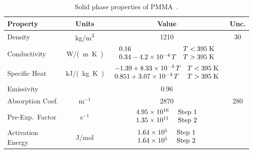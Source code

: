 \begin{table}[!h]
\caption[Solid phase PMMA properties]{Solid phase properties of PMMA~\cite{Fiola:FSJ2021}.}
\begin{center}
\begin{tabular}{|l|c|c|c|}
\hline
Property                    & Units         & Value                                                                                                                                        & Unc.           \\ \hline \hline
Density                     & \unit{kg/m^3}      & 1210                                                                                                                                         & 30             \\ \hline
Conductivity                & \unit{W/(m.K)} & $\begin{array}{ll} 0.16  & T<395 \; \hbox{K} \\  0.34 - 4.2 \times 10^{-4} \, T  & T>395 \; \hbox{K} \end{array}$                            &                \\ \hline
Specific Heat               & \unit{kJ/(kg.K)}       & $\begin{array}{ll} -1.39+ 8.33 \times 10^{-3} \, T & T<395 \; \hbox{K} \\ 0.851 + 3.07 \times 10^{-3} \, T & T>395 \; \hbox{K} \end{array}$  &                \\ \hline
Emissivity                  &               & 0.96                                                                                                                                         &                \\ \hline
Absorption Coef.            & m$^{-1}$      & 2870                                                                                                                                         & 280            \\ \hline
Pre-Exp.~Factor             & s$^{-1}$      & $\begin{array}{ll} 4.95 \times 10^{16} & \hbox{ Step 1} \\ 1.35 \times 10^{11} & \hbox{ Step 2} \end{array}$                                 &                \\ \hline
Activation Energy           & J/mol         & $\begin{array}{ll} 1.64 \times 10^{5}  & \hbox{ Step 1} \\ 1.64 \times 10^{5}  & \hbox{ Step 2} \end{array}$                                 &                \\ \hline

\end{tabular}
\end{center}
\end{table}
